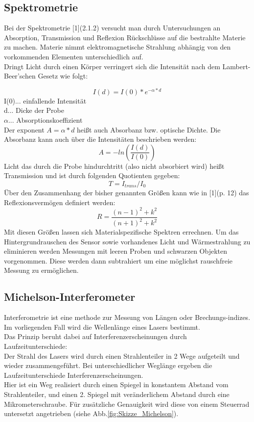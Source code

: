 \documentclass[12pt,a4paper]{article}
\begin{document}
\begin{multicols}{2}
\subsection{Spektrometrie}
Bei der Spektrometrie [1](2.1.2) versucht man durch Untersuchungen an Absorption, Transmission und Reflexion Rückschlüsse auf die bestrahlte Materie zu machen. Materie nimmt elektromagnetische Strahlung abhängig von den vorkommenden Elementen unterschiedlich auf. \\
Dringt Licht durch einen Körper verringert sich die Intensität nach dem Lambert-Beer'schen Gesetz wie folgt:

$$I(d) = I(0) * e^{-\alpha *d}$$
I(0)... einfallende Intensität\\
d... Dicke der Probe\\
$\alpha$... Absorptionskoeffizient\\
Der exponent $A = \alpha * d$ heißt auch Absorbanz bzw. optische Dichte. Die Absorbanz kann auch über die Intensitäten beschrieben werden:
$$A = - ln\left( \frac{I(d)}{I(0)} \right)$$
Licht das durch die Probe hindurchtritt (also nicht absorbiert wird) heißt Transmission und ist durch folgenden Quotienten gegeben:\\
$$T = I_{trans}/I_0$$
Über den Zusammenhang der bisher genannten Größen kann wie in [1](p. 12) das Reflexionsvermögen definiert werden:
$$R = \frac{(n-1)^2 + k^2}{(n+1)^2 + k^2}$$
Mit diesen Größen lassen sich Materialspezifische Spektren errechnen. Um das Hintergrundrauschen des Sensor sowie vorhandenes Licht und Wärmestrahlung zu eliminieren werden Messungen mit leeren Proben und schwarzen Objekten vorgenommen. Diese werden dann subtrahiert um eine möglichst rauschfreie Messung zu ermöglichen.



\subsection{Michelson-Interferometer}

Interferometrie ist eine methode zur Messung von Längen oder Brechungs-indizes.\\
Im vorliegenden Fall wird die Wellenlänge eines Lasers bestimmt.\\
Das Prinzip beruht dabei auf Interferenzerscheinungen durch Laufzeitunterschiede:\\
Der Strahl des Lasers wird durch einen Strahlenteiler in 2 Wege aufgeteilt und wieder zusammengeführt. Bei unterschiedlicher Weglänge ergeben die Laufzeitunterschiede Interferenzerscheinungen.\\
Hier ist ein Weg realisiert durch einen Spiegel in konstantem Abstand vom Strahlenteiler, und einen 2. Spiegel mit veränderlichem Abstand durch eine Mikrometerschraube. Für zusätzliche Genauigkeit wird diese von einem Steuerrad untersetzt angetrieben (siehe Abb.\ref{fig:Skizze_Michelson}).


\end{multicols}
\end{document}
